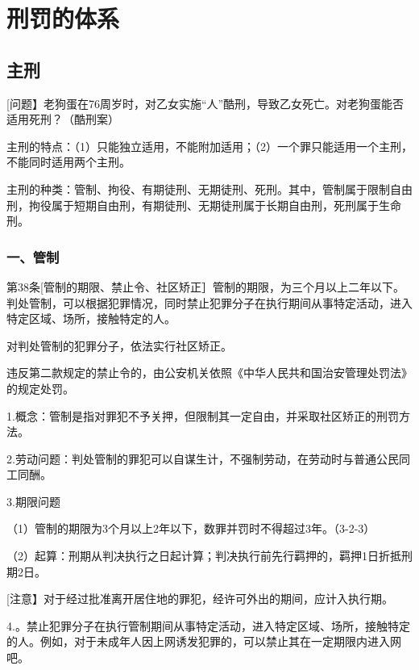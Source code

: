 \chapter{刑罚的体系}

\begin{EditionOpeningPanel}
\end{EditionOpeningPanel}

\section{主刑}

[问题】老狗蛋在76周岁时，对乙女实施“人”酷刑，导致乙女死亡。对老狗蛋能否适用死刑？（酷刑案）

主刑的特点：（1）只能独立适用，不能附加适用；（2）一个罪只能适用一个主刑，不能同时适用两个主刑。

主刑的种类：管制、拘役、有期徒刑、无期徒刑、死刑。其中，管制属于限制自由刑，拘役属于短期自由刑，有期徒刑、无期徒刑属于长期自由刑，死刑属于生命刑。

\subsection*{一、管制}

第38条[管制的期限、禁止令、社区矫正］管制的期限，为三个月以上二年以下。判处管制，可以根据犯罪情况，同时禁止犯罪分子在执行期间从事特定活动，进入特定区域、场所，接触特定的人。

对判处管制的犯罪分子，依法实行社区矫正。

违反第二款规定的禁止令的，由公安机关依照《中华人民共和国治安管理处罚法》的规定处罚。

1.概念：管制是指对罪犯不予关押，但限制其一定自由，并采取社区矫正的刑罚方法。

2.劳动问题：判处管制的罪犯可以自谋生计，不强制劳动，在劳动时与普通公民同工同酬。

3.期限问题

（1）管制的期限为3个月以上2年以下，数罪并罚时不得超过3年。（3-2-3）

（2）起算：刑期从判决执行之日起计算；判决执行前先行羁押的，羁押1日折抵刑期2日。

[注意】对于经过批准离开居住地的罪犯，经许可外出的期间，应计入执行期。

4.。禁止犯罪分子在执行管制期间从事特定活动，进入特定区域、场所，接触特定的人。例如，对于未成年人因上网诱发犯罪的，可以禁止其在一定期限内进入网吧。

